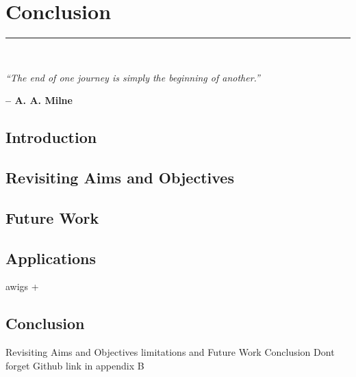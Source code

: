 \graphicspath{{content/chapters/6_conclusion/figures/}}

\chapter{Conclusion}%
\label{chp:conclusion}
\rule{\textwidth}{1pt} \\[1ex]

\epigraph{\textit{``The end of one journey is simply the beginning of another.''}}{\textbf{-- A. A. Milne}}

\section{Introduction}
\label{sec:6_introduction}

\section{Revisiting Aims and Objectives}
\label{sec:6_revisiting_aims}

\section{Future Work}
\label{sec:6_future_work}

\section{Applications}
\label{sec:6_applications}

\gls{awigs} + \cite{awigs_project}

\section{Conclusion}
\label{sec:6_conclusion}


Revisiting Aims and Objectives
limitations and Future Work
Conclusion Dont forget Github link in appendix B